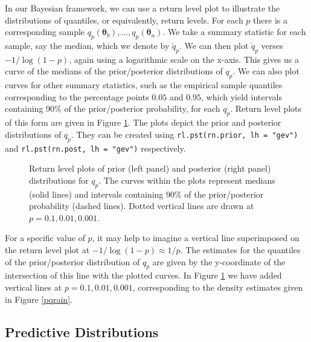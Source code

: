 \documentclass[11pt,a4paper]{article}
\newcommand{\bs}{\boldsymbol}
\begin{document}
In our Bayesian framework, we can use a return level plot to
illustrate the distributions of quantiles, or equivalently, return
levels.  For each $p$ there is a corresponding sample
$q_{p}(\bs{\theta}_b), \dots, q_{p}(\bs{\theta}_n)$.  We take a
summary statistic for each sample, say the median, which we denote by
$\check{q}_{p}$.  We can then plot $\check{q}_{p}$ verses
$-1/\log(1-p)$, again using a logarithmic scale on the x-axis.  This
gives us a curve of the medians of the prior/posterior distributions
of $q_p$.  We can also plot curves for other summary statistics, such
as the empirical sample quantiles corresponding to the percentage
points $0.05$ and $0.95$, which yield intervals containing 90\% of the
prior/posterior probability, for each $q_p$.  Return level plots of
this form are given in Figure \ref{rlrain}.  The plots depict the
prior and posterior distributions of $q_p$.  They can be created using
\verb+rl.pst(rn.prior, lh = "gev")+ and
\verb+rl.pst(rn.post, lh = "gev")+ respectively.

\begin{figure}
\begin{center}
   \vspace{-1.5cm}
  \hspace{0cm} 
\end{center}
\caption{Return level plots of prior (left panel) and posterior (right
  panel) distributions for $q_p$. The curves within the plots
  represent medians (solid lines) and intervals containing 90\% of the
  prior/posterior probability (dashed lines). Dotted vertical lines
  are drawn at $p = 0.1, 0.01, 0.001$.}
\label{rlrain}
\end{figure}

For a specific value of $p$, it may help to imagine a vertical line
superimposed on the return level plot at $-1/\log(1-p) \approx 1/p$.
The estimates for the quantiles of the prior/posterior distribution of
$q_p$ are given by the y-coordinate of the intersection of this line
with the plotted curves.  In Figure \ref{rlrain} we have added
vertical lines at $p = 0.1,0.01,0.001$, corresponding to the density
estimates given in Figure \ref{pqrain}.

\subsection{Predictive Distributions}
\label{predictive}
\end{document}
